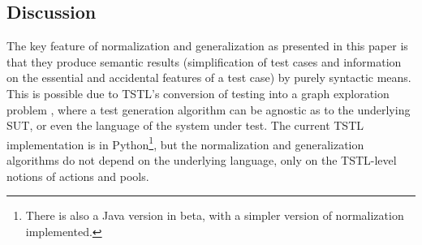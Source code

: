 \subsection{Discussion}

The key feature of normalization and generalization as presented in
this paper is that they produce semantic results (simplification of
test cases and information on the essential and accidental features of
a test case) by purely syntactic means.  This is possible due to
TSTL's conversion of testing into a graph exploration problem
\cite{NFM15}, where a test generation algorithm can be agnostic as to
the underlying SUT, or even the language of the system under test.
The current TSTL implementation is in Python\footnote{There is also a
  Java version in beta, with a simpler version of normalization
  implemented.}, but the normalization and generalization algorithms
do not depend on the underlying language, only on the TSTL-level
notions of actions and pools.
